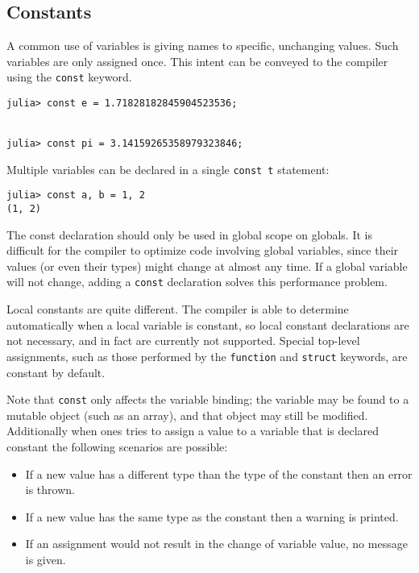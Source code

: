 \documentclass[
]{article}
\providecommand{\tightlist}{%
  \setlength{\itemsep}{0pt}\setlength{\parskip}{0pt}}
\begin{document}
\hypertarget{constants}{%
\subsection{Constants}\label{constants}}

A common use of variables is giving names to specific, unchanging
values. Such variables are only assigned once. This intent can be
conveyed to the compiler using the \texttt{const} keyword.

\begin{verbatim}
julia> const e = 1.71828182845904523536;


julia> const pi = 3.14159265358979323846;
\end{verbatim}

Multiple variables can be declared in a single \texttt{const\ t}
statement:

\begin{verbatim}
julia> const a, b = 1, 2
(1, 2)
\end{verbatim}

The const declaration should only be used in global scope on globals. It
is difficult for the compiler to optimize code involving global
variables, since their values (or even their types) might change at
almost any time. If a global variable will not change, adding a
\texttt{const} declaration solves this performance problem.

Local constants are quite different. The compiler is able to determine
automatically when a local variable is constant, so local constant
declarations are not necessary, and in fact are currently not supported.
Special top-level assignments, such as those performed by the
\texttt{function} and \texttt{struct} keywords, are constant by default.

Note that \texttt{const} only affects the variable binding; the variable
may be found to a mutable object (such as an array), and that object may
still be modified. Additionally when ones tries to assign a value to a
variable that is declared constant the following scenarios are possible:

\begin{itemize}
\tightlist
\item
  If a new value has a different type than the type of the constant then
  an error is thrown.
\item
  If a new value has the same type as the constant then a warning is
  printed.
\item
  If an assignment would not result in the change of variable value, no
  message is given.
\end{itemize}
\end{document}
